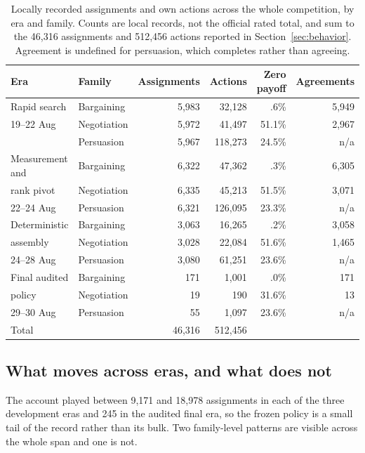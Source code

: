 \begin{table}[H]
\centering
\scriptsize
\caption{Locally recorded assignments and own actions across the whole
competition, by era and family. Counts are local records, not the official
rated total, and sum to the 46,316 assignments and 512,456 actions reported in
Section~\ref{sec:behavior}. Agreement is undefined for persuasion, which
completes rather than agreeing.}
\label{tab:lifecycle-era}
\setlength{\tabcolsep}{3.4pt}
\renewcommand{\arraystretch}{0.95}
\begin{tabular}{@{}llrrrr@{}}
\toprule
Era & Family & Assignments & Actions & Zero payoff & Agreements \\
\midrule
Rapid search & Bargaining & 5,983 & 32,128 & .6\% & 5,949 \\
19--22 Aug & Negotiation & 5,972 & 41,497 & 51.1\% & 2,967 \\
 & Persuasion & 5,967 & 118,273 & 24.5\% & n/a \\
\midrule
Measurement and & Bargaining & 6,322 & 47,362 & .3\% & 6,305 \\
rank pivot & Negotiation & 6,335 & 45,213 & 51.5\% & 3,071 \\
22--24 Aug & Persuasion & 6,321 & 126,095 & 23.3\% & n/a \\
\midrule
Deterministic & Bargaining & 3,063 & 16,265 & .2\% & 3,058 \\
assembly & Negotiation & 3,028 & 22,084 & 51.6\% & 1,465 \\
24--28 Aug & Persuasion & 3,080 & 61,251 & 23.6\% & n/a \\
\midrule
Final audited & Bargaining & 171 & 1,001 & .0\% & 171 \\
policy & Negotiation & 19 & 190 & 31.6\% & 13 \\
29--30 Aug & Persuasion & 55 & 1,097 & 23.6\% & n/a \\
\midrule
Total & & 46,316 & 512,456 & & \\
\bottomrule
\end{tabular}
\end{table}

\subsection{What moves across eras, and what does not}

The account played between 9,171 and 18,978 assignments in each of the three
development eras and 245 in the audited final era, so the frozen policy is a
small tail of the record rather than its bulk. Two family-level patterns are
visible across the whole span and one is not.

